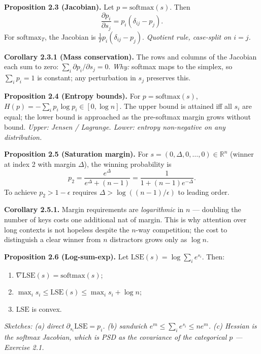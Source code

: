 \documentclass[
]{article}
\providecommand{\tightlist}{%
  \setlength{\itemsep}{0pt}\setlength{\parskip}{0pt}}
\begin{document}
\textbf{Proposition 2.3 (Jacobian).} Let \(p = \text{softmax}(s)\). Then
\[\frac{\partial p_i}{\partial s_j} = p_i(\delta_{ij} - p_j).\] For
\(\text{softmax}_T\), the Jacobian is
\(\tfrac{1}{T} p_i(\delta_{ij} - p_j)\). \emph{Quotient rule, case-split
on \(i = j\).}

\textbf{Corollary 2.3.1 (Mass conservation).} The rows and columns of
the Jacobian each sum to zero:
\(\sum_i \partial p_i / \partial s_j = 0\). \emph{Why:} softmax maps to
the simplex, so \(\sum_i p_i = 1\) is constant; any perturbation in
\(s_j\) preserves this.

\textbf{Proposition 2.4 (Entropy bounds).} For
\(p = \text{softmax}(s)\),
\(H(p) = -\sum_i p_i \log p_i \in [0, \log n]\). The upper bound is
attained iff all \(s_i\) are equal; the lower bound is approached as the
pre-softmax margin grows without bound. \emph{Upper: Jensen / Lagrange.
Lower: entropy non-negative on any distribution.}

\textbf{Proposition 2.5 (Saturation margin).} For
\(s = (0, \Delta, 0, \dots, 0) \in \mathbb{R}^n\) (winner at index 2
with margin \(\Delta\)), the winning probability is
\[p_2 = \frac{e^\Delta}{e^\Delta + (n-1)} = \frac{1}{1 + (n-1) e^{-\Delta}}.\]
To achieve \(p_2 > 1 - \epsilon\) requires
\(\Delta > \log((n-1)/\epsilon)\) to leading order.

\textbf{Corollary 2.5.1.} Margin requirements are \emph{logarithmic} in
\(n\) --- doubling the number of keys costs one additional nat of
margin. This is why attention over long contexts is not hopeless despite
the \(n\)-way competition; the cost to distinguish a clear winner from
\(n\) distractors grows only as \(\log n\).

\textbf{Proposition 2.6 (Log-sum-exp).} Let
\(\text{LSE}(s) = \log \sum_i e^{s_i}\). Then:

\begin{enumerate}
\def\labelenumi{(\alph{enumi})}
\tightlist
\item
  \(\nabla \text{LSE}(s) = \text{softmax}(s)\);
\item
  \(\max_i s_i \le \text{LSE}(s) \le \max_i s_i + \log n\);
\item
  \(\text{LSE}\) is convex.
\end{enumerate}

\emph{Sketches: (a) direct \(\partial_{s_i} \text{LSE} = p_i\). (b)
sandwich \(e^m \le \sum_i e^{s_i} \le n e^m\). (c) Hessian is the
softmax Jacobian, which is PSD as the covariance of the categorical
\(p\) --- Exercise 2.1.}
\end{document}
